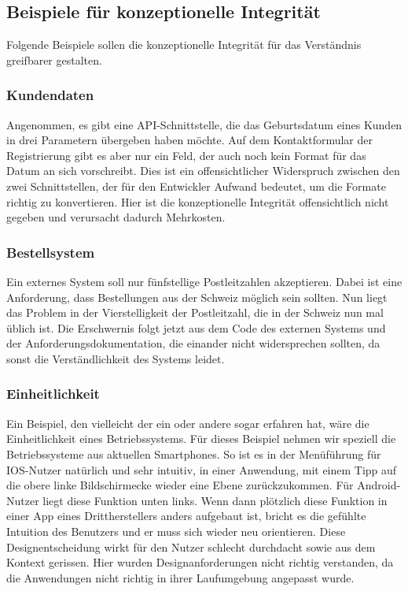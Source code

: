 \documentclass[a4paper, ngerman, 12pt, usenames, dvipsnames]{article}
\begin{document}
\subsection{Beispiele für konzeptionelle Integrität}
Folgende Beispiele sollen die konzeptionelle Integrität für das Verständnis greifbarer gestalten.

\subsubsection{Kundendaten}
Angenommen, es gibt eine API-Schnittstelle, die das Geburtsdatum eines Kunden in drei Parametern übergeben haben möchte. Auf dem Kontaktformular der Registrierung gibt es aber nur ein Feld, der auch noch kein Format für das Datum an sich vorschreibt. Dies ist ein offensichtlicher Widerspruch zwischen den zwei Schnittstellen, der für den Entwickler Aufwand bedeutet, um die Formate richtig zu konvertieren. Hier ist die konzeptionelle Integrität offensichtlich nicht gegeben und verursacht dadurch Mehrkosten.

\subsubsection{Bestellsystem}
Ein externes System soll nur fünfstellige Postleitzahlen akzeptieren. Dabei ist eine Anforderung, dass Bestellungen aus der Schweiz möglich sein sollten. Nun liegt das Problem in der Vierstelligkeit der Postleitzahl, die in der Schweiz nun mal üblich ist. Die Erschwernis folgt jetzt aus dem Code des externen Systems und der Anforderungsdokumentation, die einander nicht widersprechen sollten, da sonst die Verständlichkeit des Systems leidet.

\subsubsection{Einheitlichkeit}
Ein Beispiel, den vielleicht der ein oder andere sogar erfahren hat, wäre die Einheitlichkeit eines Betriebssystems. Für dieses Beispiel nehmen wir speziell die Betriebssysteme aus aktuellen Smartphones. So ist es in der Menüführung für IOS-Nutzer natürlich und sehr intuitiv, in einer Anwendung, mit einem Tipp auf die obere linke Bildschirmecke wieder eine Ebene zurückzukommen. Für Android-Nutzer liegt diese Funktion unten links. Wenn dann plötzlich diese Funktion in einer App eines Drittherstellers anders aufgebaut ist, bricht es die gefühlte Intuition des Benutzers und er muss sich wieder neu orientieren. Diese Designentscheidung wirkt für den Nutzer schlecht durchdacht sowie aus dem Kontext gerissen. Hier wurden Designanforderungen nicht richtig verstanden, da die Anwendungen nicht richtig in ihrer Laufumgebung angepasst wurde.\\
\end{document}
